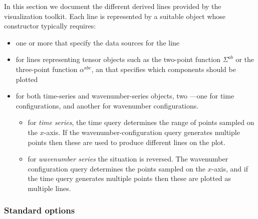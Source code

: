 \documentclass[11pt,a4paper]{article}
\newcommand{\semibold}[1]{{\fontseries{b}\selectfont{#1}}}
\begin{document}
In this section we document
the different derived lines provided by the visualization toolkit.
Each line is represented by a suitable object whose constructor
typically requires:
\begin{itemize}
    \item one or more \semibold{task objects} that specify the data sources
    for the line    
    \item for lines representing tensor objects such as the two-point
    function $\Sigma^{ab}$ or the three-point function $\alpha^{abc}$,
    an \semibold{index selector} that specifies which components should be
    plotted
    \item for both time-series and wavenumber-series objects,
    two \semibold{SQL query expressions}---one for time configurations, and
    another for wavenumber configurations.
    \begin{itemize}
        \item for \emph{time series}, the time query determines
        the range of points sampled on the $x$-axis. If the wavenumber-configuration
        query generates multiple points then these are used to produce different
        lines on the plot.
        
        \item for \emph{wavenumber series} the situation is reversed. The
        wavenumber configuration query determines the points sampled on the
        $x$-axis, and if the time query generates multiple points then these
        are plotted as multiple lines.
    \end{itemize}
\end{itemize}

\subsubsection{Standard options}
\end{document}
